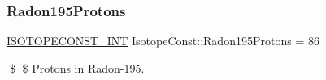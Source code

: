 \subsubsection{\texorpdfstring{Radon195\+Protons}{Radon195Protons}}
{\footnotesize\ttfamily \mbox{\hyperlink{group___isotope_const-_macros_ga5f18360b3e99483a35c32d789e62621c}{I\+S\+O\+T\+O\+P\+E\+C\+O\+N\+S\+T\+\_\+\+I\+NT}} Isotope\+Const\+::\+Radon195\+Protons = 86}

\$ \$ Protons in Radon-\/195. 